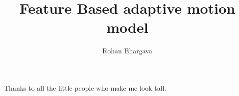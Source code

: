 \documentclass[12pt]{dalcsthesis}
\begin{document}
\mcs  %
\title{Feature Based adaptive motion model}
\author{Rohan Bhargava}


\providecommand{\tabularnewline}{\\}
\newcommand{\lyxdot}{.}

\frontmatter


\begin{abstract}

\end{abstract}

\begin{acknowledgements}
Thanks to all the little people who make me look tall.
\end{acknowledgements}

\mainmatter
\end{document}
